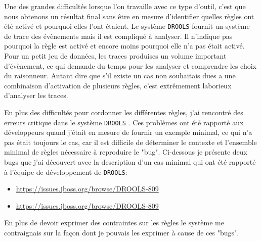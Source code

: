 \begin{refsegment}
Une des grandes difficultés lorsque l'on travaille avec ce type d'outil, c'est que nous obtenons un résultat final sans être en mesure d'identifier quelles règles ont été activé et pourquoi elles l'ont étaient. Le système \texttt{DROOLS} fournit un système de trace des évènements mais il est compliqué à analyser. Il n'indique pas pourquoi la règle est activé et encore moins pourquoi elle n'a pas était activé. Pour un petit jeu de données, les traces produises un volume important d'évènement, ce qui demande du temps pour les analyser et comprendre les choix du raisonneur. Autant dire que s'il existe un cas non souhaitais dues a une combinaison d'activation de plusieurs règles, c'est extrêmement laborieux d'analyser les traces.

En plus des difficultés pour cordonner les différentes règles, j'ai rencontré des erreurs critique dans le système \texttt{DROOLS} . Ces problèmes ont été rapporté aux développeurs quand j'était en mesure de fournir un exemple minimal, ce qui n'a pas était toujours le cas, car il est difficile de déterminer le contexte et l'ensemble minimal de règles nécessaire à reproduire le "bug". Ci-dessous je présente deux bugs que j'ai découvert avec la description d'un cas minimal  qui ont été rapporté à l'équipe de développement de \texttt{DROOLS}:
\begin{itemize}
	\item \url{https://issues.jboss.org/browse/DROOLS-809}
	\item \url{https://issues.jboss.org/browse/DROOLS-809}
\end{itemize}
 
En plus de devoir exprimer des contraintes sur les règles le système me contraignais sur la façon dont je pouvais les exprimer à cause de ces "bugs".


\end{refsegment}
